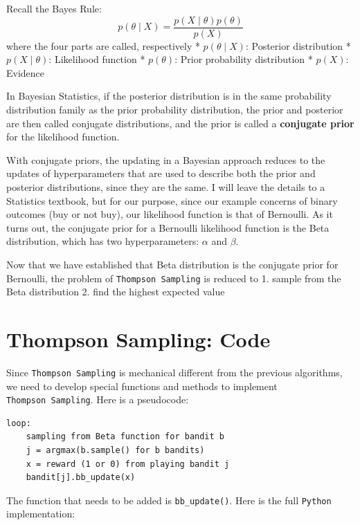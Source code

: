 \documentclass[
]{book}
\theoremstyle{definition}
\theoremstyle{definition}
\theoremstyle{definition}
\theoremstyle{definition}
\theoremstyle{remark}
\begin{document}
Recall the Bayes Rule:
\[p(\theta \mid X)=\frac{p(X \mid \theta)p(\theta)}{p(X)}\]
where the four parts are called, respectively
* \(p(\theta \mid X)\): Posterior distribution
* \(p(X \mid \theta)\): Likelihood function
* \(p(\theta)\): Prior probability distribution
* \(p(X)\): Evidence

In Bayesian Statistics, if the posterior distribution is in the same probability distribution family as the prior probability distribution, the prior and posterior are then called conjugate distributions, and the prior is called a \textbf{conjugate prior} for the likelihood function.

With conjugate priors, the updating in a Bayesian approach reduces to the updates of hyperparameters that are used to describe both the prior and posterior distributions, since they are the same. I will leave the details to a Statistics textbook, but for our purpose, since our example concerns of binary outcomes (buy or not buy), our likelihood function is that of Bernoulli. As it turns out, the conjugate prior for a Bernoulli likelihood function is the Beta distribution, which has two hyperparameters: \(\alpha\) and \(\beta\).

Now that we have established that Beta distribution is the conjugate prior for Bernoulli, the problem of \texttt{Thompson\ Sampling} is reduced to
1. sample from the Beta distribution
2. find the highest expected value

\hypertarget{thompson-sampling-code}{%
\section{Thompson Sampling: Code}\label{thompson-sampling-code}}

Since \texttt{Thompson\ Sampling} is mechanical different from the previous algorithms, we need to develop special functions and methods to implement \texttt{Thompson\ Sampling}. Here is a pseudocode:

\begin{verbatim}
loop:
    sampling from Beta function for bandit b
    j = argmax(b.sample() for b bandits)
    x = reward (1 or 0) from playing bandit j
    bandit[j].bb_update(x)
\end{verbatim}

The function that needs to be added is \texttt{bb\_update()}. Here is the full \texttt{Python} implementation:
\end{document}
